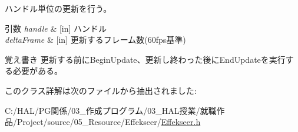 ハンドル単位の更新を行う。 


\begin{DoxyParams}{引数}
{\em handle} & \mbox{[}in\mbox{]} ハンドル \\
\hline
{\em delta\+Frame} & \mbox{[}in\mbox{]} 更新するフレーム数(60fps基準) \\
\hline
\end{DoxyParams}
\begin{DoxyNote}{覚え書き}
更新する前に\+Begin\+Update、更新し終わった後に\+End\+Updateを実行する必要がある。 
\end{DoxyNote}


このクラス詳解は次のファイルから抽出されました\+:\begin{DoxyCompactItemize}
\item 
C\+:/\+H\+A\+L/\+P\+G関係/03\+\_\+作成プログラム/03\+\_\+\+H\+A\+L授業/就職作品/\+Project/source/05\+\_\+\+Resource/\+Effekseer/\mbox{\hyperlink{_effekseer_8h}{Effekseer.\+h}}\end{DoxyCompactItemize}
